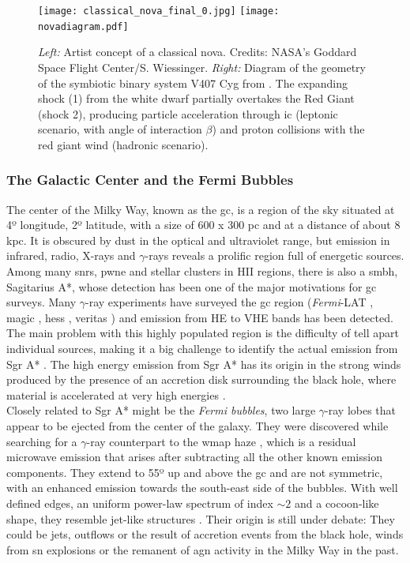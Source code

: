 \documentclass[main.tex]{subfiles}
\begin{document}
 \begin{figure}[!htb]
\texttt{[image: classical\_nova\_final\_0.jpg]}
\endminipage\hfill
{}
\texttt{[image: novadiagram.pdf]}
\endminipage\hfill
\caption{\label{fig:novae} \textit{Left:} Artist concept of a classical nova. Credits: NASA's Goddard Space Flight Center/S. Wiessinger. \textit{Right:} Diagram of the geometry of the symbiotic binary system V407 Cyg from \cite{2012novagammaneutrinos}. The expanding shock (1) from the white dwarf partially overtakes the Red Giant (shock 2), producing particle acceleration through \gls{ic} (leptonic scenario, with angle of interaction $\beta$) and proton collisions with the red giant wind (hadronic scenario).}
\end{figure}

\subsubsection{The Galactic Center and the Fermi Bubbles} \label{sec:GCFermiBubbles}

The center of the Milky Way, known as the \gls{gc}, is a region of the sky situated at 4º longitude, 2º latitude, with a size of 600 x 300 pc and at a distance of about 8 kpc. It is obscured by dust in the optical and ultraviolet range, but emission in infrared, radio, X-rays and $\gamma$-rays reveals a prolific region full of energetic sources. Among many \glspl{snr}, \gls{pwne} and stellar clusters in HII regions, there is also a \gls{smbh}, Sagitarius A*, whose detection has been one of the major motivations for \gls{gc} surveys. Many $\gamma$-ray experiments have surveyed the \gls{gc} region (\textit{Fermi}-LAT , \gls{magic} \cite{2006GCMAGIC}, \gls{hess} \cite{2018GPHESS}, \gls{veritas} \cite{2016GCveritas}) and emission from HE to VHE bands has been detected. The main problem with this highly populated region is the difficulty of tell apart individual sources, making it a big challenge to identify the actual emission from  Sgr A* \cite{2011GC}. The high energy emission from Sgr A* has its origin in the strong winds produced by the presence of an accretion disk surrounding the black hole, where material is accelerated at very high energies \cite{2007GC}.\\

Closely related to Sgr A* might be the \textit{Fermi bubbles}, two large $\gamma$-ray lobes that appear to be ejected from the center of the galaxy. They were discovered while searching for a $\gamma$-ray counterpart to the \gls{wmap} haze \cite{2010Afbubblesdiscovery}, which is a residual microwave emission that arises after subtracting all the other known emission components. They extend to 55º up and above the \gls{gc} and are not symmetric, with an enhanced emission towards the south-east side of the bubbles. With well defined edges, an uniform power-law spectrum of index $\sim 2$ and a cocoon-like shape, they resemble jet-like structures \cite{2014Fbubbles}. Their origin is still under debate: They could be jets, outflows or the result of accretion events from the black hole, winds from \gls{sn} explosions or the remanent of \gls{agn} activity in the Milky Way in the past. \\
\end{document}
